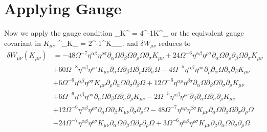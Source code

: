\documentclass[10pt,letterpaper]{article}
\begin{document}
\section*{Applying Gauge}
Now we apply the gauge condition
\be
	 \del_\nu  K^{\mu\nu} = 4\Omega^{-1}K^{\mu\nu}\pd_\nu \Omega
\ee
or the equivalent gauge covariant in $K_{\mu\nu}$ 
\be
	\eta^{\alpha\beta}\pd_\alpha K_{\mu\beta} = 2\Omega^{-1}\eta^{\alpha\beta}K_{\mu\beta}\pd_\alpha \Omega.
\ee
and $\delta W_{\mu\nu}$ reduces to
\begin{align}
	\delta  W_{\mu\nu}(K_{\mu\nu})&= 
- 48\Omega^{-7} \eta^{\alpha \beta} \eta^{\rho \sigma} \partial_{\alpha}\Omega \partial_{\beta}\Omega \partial_{\rho}\Omega \partial_{\sigma}K_{\mu \nu} + 24\Omega^{-6} \eta^{\alpha \beta} \eta^{\rho \sigma} \partial_{\alpha}\Omega \partial_{\rho}\partial_{\beta}\Omega \partial_{\sigma}K_{\mu \nu} \nonumber\\
& + 60\Omega^{-8} \eta^{\alpha \beta} \eta^{\rho \sigma} K_{\mu \nu} \partial_{\alpha}\Omega \partial_{\beta}\Omega \partial_{\rho}\Omega \partial_{\sigma}\Omega - 4\Omega^{-5} \eta^{\alpha \beta} \eta^{\rho \sigma} \partial_{\rho}\partial_{\alpha}\Omega \partial_{\sigma}\partial_{\beta}K_{\mu \nu} \nonumber \\
&+ 6\Omega^{-6} \eta^{\alpha \beta} \eta^{\rho \sigma} K_{\mu \nu} \partial_{\rho}\partial_{\alpha}\Omega \partial_{\sigma}\partial_{\beta}\Omega + 12\Omega^{-6} \eta^{\alpha \rho} \eta^{\beta \sigma} \partial_{\alpha}\Omega \partial_{\beta}\Omega \partial_{\sigma}\partial_{\rho}K_{\mu \nu}\nonumber\\
& + 6 \Omega^{-6}\eta^{\alpha \beta} \eta^{\rho \sigma} \partial_{\alpha}\Omega \partial_{\beta}\Omega \partial_{\sigma}\partial_{\rho}K_{\mu \nu} - 2\Omega^{-5} \eta^{\alpha \beta} \eta^{\rho \sigma} \partial_{\beta}\partial_{\alpha}\Omega \partial_{\sigma}\partial_{\rho}K_{\mu \nu}  \nonumber \\
&+ 12\Omega^{-6} \eta^{\alpha \beta} \eta^{\rho \sigma} \partial_{\alpha}\Omega \partial_{\beta}K_{\mu \nu} \partial_{\sigma}\partial_{\rho}\Omega -  48\Omega^{-7} \eta^{\alpha \rho} \eta^{\beta \sigma} K_{\mu \nu} \partial_{\alpha}\Omega \partial_{\beta}\Omega \partial_{\sigma}\partial_{\rho}\Omega\nonumber\\
 &-  24\Omega^{-7} \eta^{\alpha \beta} \eta^{\rho \sigma} K_{\mu \nu} \partial_{\alpha}\Omega \partial_{\beta}\Omega \partial_{\sigma}\partial_{\rho}\Omega  + 3\Omega^{-6} \eta^{\alpha \beta} \eta^{\rho \sigma} K_{\mu \nu} \partial_{\beta}\partial_{\alpha}\Omega \partial_{\sigma}\partial_{\rho}\Omega\nonumber\\

\end{align}
\end{document}
